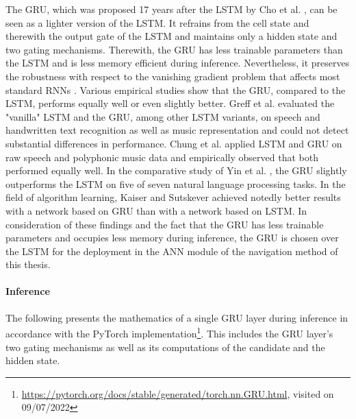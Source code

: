 The GRU,
which was proposed 17 years after the LSTM by Cho et al. \cite{Cho2014},
can be seen as a lighter version of the LSTM.
It refrains from the cell state and therewith the output gate
of the LSTM and maintains only a hidden state and two gating mechanisms.
Therewith, the GRU has less trainable parameters than the LSTM
and is less memory efficient during inference.
Nevertheless, it preserves the robustness with respect to the 
vanishing gradient problem that affects most standard RNNs \cite{ICE2020}.
Various empirical studies show that the GRU, compared to the LSTM,
performs equally well or even slightly better.
Greff et al. \cite{Greff2017} evaluated 
the "vanilla" LSTM and the GRU, among other LSTM variants,
on speech and handwritten text recognition
as well as music representation
and could not detect substantial differences in performance.
Chung et al. \cite{Chung2014} applied LSTM and GRU on
raw speech and polyphonic music data and empirically
observed that both performed equally well.
In the comparative study of 
Yin et al. \cite{Yin2017}, 
the GRU slightly outperforms
the LSTM on five of seven
natural language processing tasks.
In the field of algorithm learning, 
Kaiser and Sutskever \cite{Kaiser2015} achieved notedly better results 
with a network based on GRU
than with a network based on LSTM.
In consideration of these findings and the
fact that the GRU has less trainable parameters
and occupies less memory during inference,
the GRU is chosen over the LSTM for the deployment 
in the ANN module of the navigation method of this thesis.




\paragraph*{Inference}$\ $\\
The following presents the mathematics of a single GRU layer during inference
in accordance with the PyTorch implementation\footnote{
    \url{https://pytorch.org/docs/stable/generated/torch.nn.GRU.html}, visited on 09/07/2022
}.
This includes the GRU layer's two gating mechanisms
as well as its computations of the candidate and the hidden state.






